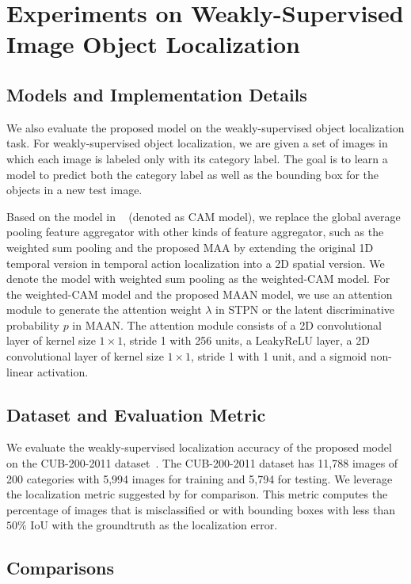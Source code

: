 \documentclass{article} \usepackage{iclr2019_conference,times}
\begin{document}
\section{Experiments on Weakly-Supervised Image Object Localization}\label{exp_det}
\subsection{Models and Implementation Details}
We also evaluate the proposed model on the weakly-supervised object localization task. For weakly-supervised object localization, we are given a set of images in which each image is labeled only with its category label. The goal is to learn a model to predict both the category label as well as the bounding box for the objects in a new test image. 

Based on the model in ~\citep{CAM} (denoted as CAM model), we replace the global average pooling feature aggregator with other kinds of feature aggregator, such as the weighted sum pooling and the proposed MAA by extending the original 1D temporal version in temporal action localization into a 2D spatial version. We denote the model with weighted sum pooling as the weighted-CAM model. For the weighted-CAM model and the proposed MAAN model, we use an attention module to generate the attention weight $\lambda$ in STPN or the latent discriminative probability $ p $ in MAAN. The attention module consists of a 2D convolutional layer of kernel size $ 1 \times 1 $, stride 1 with 256 units, a LeakyReLU layer, a 2D convolutional layer of kernel size $ 1 \times 1 $, stride 1 with 1 unit, and a sigmoid non-linear activation. 


\subsection{Dataset and Evaluation Metric}
We evaluate the weakly-supervised localization accuracy of the proposed model on the CUB-200-2011 dataset~\citep{WahCUB_200_2011}.  The CUB-200-2011 dataset has 11,788 images of 200 categories with 5,994 images for training and 5,794 for testing. We leverage the localization metric suggested by \citep{russakovsky2015imagenet} for comparison. This metric computes the percentage of images that is misclassified or with bounding boxes with less than $50\%$ IoU with the groundtruth as the localization error.

\subsection{Comparisons}
\end{document}
